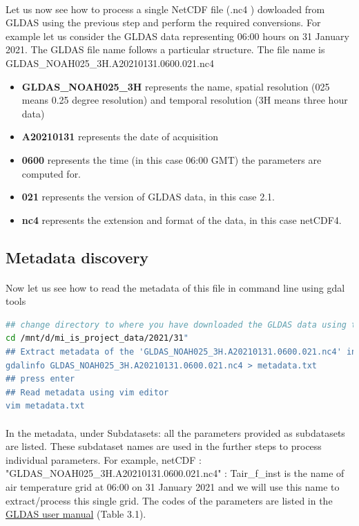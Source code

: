 \paragraph{}
Let us now see how to process a single NetCDF file (.\scriptsize{nc4} \normalsize)  dowloaded from GLDAS using the previous step and perform the required conversions.
For example let us consider the GLDAS data representing 06:00 hours on 31 January 2021.
The GLDAS file name follows a particular structure.
\newline
The file name is \scriptsize{GLDAS\_NOAH025\_3H.A20210131.0600.021.nc4} \normalsize
\begin{itemize}
\item \textbf{GLDAS\_NOAH025\_3H} represents the name, spatial resolution (025 means 0.25 degree resolution) and temporal resolution (3H means three hour data)
\item \textbf{A20210131}  represents the date of acquisition
\item \textbf{0600}  represents the time (in this case 06:00 GMT) the parameters are computed for.
\item \textbf{021}  represents the version of GLDAS data, in this case 2.1.
\item \textbf{nc4}  represents the extension and format of the data, in this case netCDF4.
\end{itemize}


\subsection{ Metadata discovery}
\paragraph{}
Now let us see how to read the metadata of this file in command line using gdal tools
\begin{lstlisting}[language=Bash]
## change directory to where you have downloaded the GLDAS data using the below
cd /mnt/d/mi_is_project_data/2021/31"
## Extract metadata of the 'GLDAS_NOAH025_3H.A20210131.0600.021.nc4' in the file "metadata.txt"
gdalinfo GLDAS_NOAH025_3H.A20210131.0600.021.nc4 > metadata.txt
## press enter
## Read metadata using vim editor
vim metadata.txt
\end{lstlisting}
\paragraph{}
In the metadata, under Subdatasets: all the parameters provided as subdatasets are listed. 
These subdataset names are used in the further steps to process individual parameters. For example, netCDF : \scriptsize{"GLDAS\_NOAH025\_3H.A20210131.0600.021.nc4" : Tair\_f\_inst} \normalsize is the name of air temperature grid at 06:00 on 31 January 2021 and we will use this name to extract/process this single grid. 
The codes of the parameters are listed in the \href{https://hydro1.gesdisc.eosdis.nasa.gov/data/GLDAS/GLDAS_NOAH025_3H.2.1/doc/README_GLDAS2.pdf}{GLDAS user manual} (Table 3.1).
